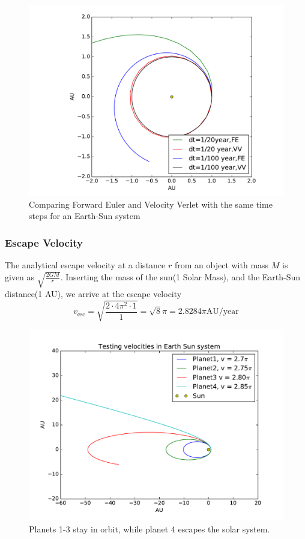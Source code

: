 \documentclass[a4paper]{article}
\begin{document}
\begin{figure}[ht]
\includegraphics[width=\textwidth]{fig/timestep_test.pdf}
\caption{Comparing Forward Euler and Velocity Verlet with the same time steps for an Earth-Sun system}
\label{fig:timestep_test}
\end{figure}


\subsubsection{Escape Velocity}
The analytical escape velocity at a distance $r$ from an object with mass $M$ is given as $\sqrt{\frac{2GM}{r}}$. Inserting the mass of the sun(1 Solar Mass), and the Earth-Sun distance(1 AU), we arrive at the escape velocity
\begin{equation}
v_{\mathrm{esc}} = \sqrt{\frac{2\cdot 4\pi^2 \cdot 1}{1}} = \sqrt{8}\pi = 2.8284\pi \mathrm{AU}/\mathrm{year} \label{eq:escape_velocity}
\end{equation}

\begin{figure}[ht]
\includegraphics[width=\textwidth]{fig/escape_velocity.pdf}
\caption{Planets 1-3 stay in orbit, while planet 4 escapes the solar system.}
\label{fig:escape_velocity}
\end{figure}
\end{document}
